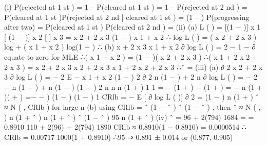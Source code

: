 \documentclass[a4paper,12pt]{article}
\begin{document}
(i) P(rejected at 1 st ) = 1 – P(cleared at 1 st ) = 1 – \theta
P(rejected at 2 nd ) = P(cleared at 1 st )P(rejected at 2 nd | cleared at 1 st )
= \theta (1 – \theta)
P(progressing after two) = P(cleared at 1 st ) P(cleared at 2 nd ) = 
(ii)
(a)
L ( \theta ) = [(1 − \theta )] x 1 [ \theta (1 − \theta )] x 2 [  ] x 3
= \theta x 2 + 2 x 3 (1 − \theta ) x 1 + x 2
∴ log L ( \theta ) = ( x 2 + 2 x 3 ) log \theta + ( x 1 + x 2 ) log(1 − \theta )
∴
(b)
x + 2 x 3 x 1 + x 2
∂
log L ( \theta ) = 2
−
1 − \theta
∂\theta
\theta
equate to zero for MLE
∴\theta ( x 1 + x 2 ) = (1 − \theta )( x 2 + 2 x 3 )
∴\theta ( x 1 + 2 x 2 + 2 x 3 ) = x 2 + 2 x 3
x 2 + 2 x 3
x 1 + 2 x 2 + 2 x 3
∴\theta ˆ =
(iii)
(a)
∂ 2 x 2 + 2 x 3
∂\theta {}
log L ( \theta ) = −
2
E {
−
x 1 + x 2
(1 − \theta ) 2
∂ 2 n \theta (1 − \theta ) + 2 n 
∂\theta {}
log L ( \theta )} = −
2
−
n (1 − \theta ) + n \theta (1 − \theta )
(1 − \theta ) 2
n
n
n (1 + \theta )
1
1
= − (1 + \theta ) −
(1 + \theta ) = − n (1 + \theta )( +
) =−
\theta
{} − \theta )
\theta (1 − \theta )
(1 − \theta )
1
CRlb =
− E [
∂
log L ( \theta )]
∂
2
=
\theta (1 − \theta )
n (1 + \theta )
\theta ˆ ≈ N ( \theta , CRlb ) for large n
(b)
using CRlb =
\theta ˆ (1 − \theta ˆ )
\theta ˆ (1 − \theta ˆ )
, then \theta ˆ ≈ N ( \theta ,
)
n (1 + \theta ˆ )
n (1 + \theta ˆ )
\theta ˆ (1 − \theta ˆ )
95%
n (1 + \theta ˆ )
(iv)
\theta ˆ =
96 + 2(794)
1684
=
= 0.8910
110 + 2(96) + 2(794) 1890
CRlb ≈
0.8910(1 − 0.8910)
= 0.0000514 ∴ CRlb = 0.00717
1000(1 + 0.8910)
∴95%
⇒ 0.891 ± 0.014 or (0.877, 0.905)
\end{document}
